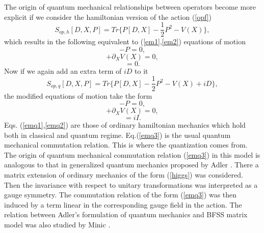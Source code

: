 \documentclass[a4paper,11pt]{article}
\begin{document}
 The origin of quantum mechanical relationships between operators
 become more explicit if we consider the hamiltonian version of the
action (\ref{opf})
\begin{equation}
S_{op,h}[D,X,P]=Tr \Big\{ P[D,X]-\frac{1}{2}P^2 - V(X)    \Big\},
\label{opfh}
\end{equation}
which results in the following equivalent to (\ref{em1},\ref{em2})
equations of motion
\begin{equation}
[D,X]-P=0, \label{emh1}
\end{equation}
\begin{equation}
[D,P] + \partial_X V(X)=0, \label{emh2}
\end{equation}
\begin{equation}
[X,P]=0. \label{emh3}
\end{equation}
Now if we again add an extra term of $iD$ to it
\begin{equation}
S_{op,q}[D,X,P]=Tr \Big\{ P[D,X]-\frac{1}{2}P^2 - V(X)+iD \Big\},
\label{opfq}
\end{equation}
the modified equations of motion take the form
\begin{equation}
[D,X]-P=0, \label{emq1}
\end{equation}
\begin{equation}
[D,P] + \partial_X V(X)=0, \label{emq2}
\end{equation}
\begin{equation}
[P,X]=iI. \label{emq3}
\end{equation}
Eqs. (\ref{emq1},\ref{emq2}) are those of ordinary hamiltonian
mechanics which hold both in classical and quantum regime.
Eq.(\ref{emq3}) is the usual quantum mechanical commutation
relation. This is where the quantization comes from. The origin of
quantum mechanical commutation relation (\ref{emq3}) in this model
is analogous to that in generalized quantum mechanics proposed by
Adler \cite{adlerbook}. There a matrix extension of ordinary
mechanics of the form (\ref{higgs}) was considered. Then the
invariance with respect to unitary transformations was interpreted
as a gauge symmetry. The commutation relation of the form
(\ref{emq3}) was then induced by a term linear in the
corresponding gauge field in the action. The relation between
Adler's formulation of quantum mechanics and BFSS matrix model was
also studied by Minic \cite{minic}.
\end{document}
